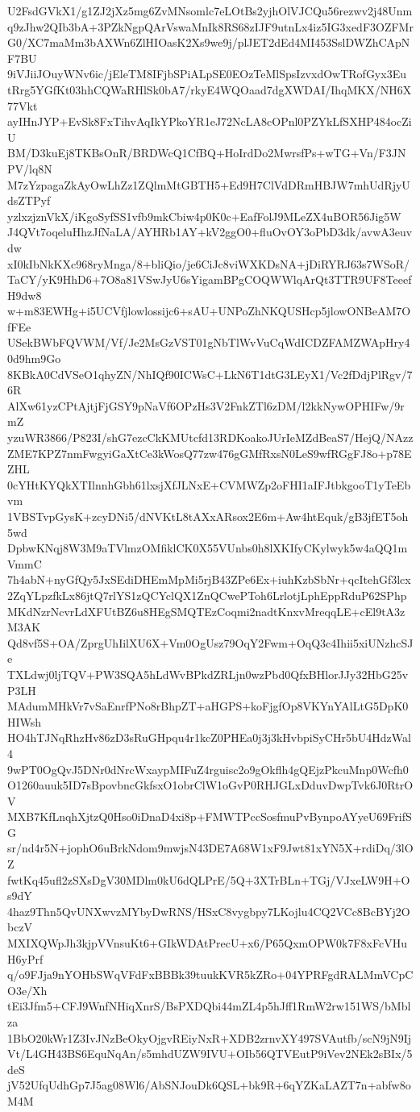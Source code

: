 U2FsdGVkX1/g1ZJ2jXz5mg6ZvMNsomlc7eLOtBs2yjhOlVJCQu56rezwv2j48Unm
q9zJhw2QIb3bA+3PZkNgpQArVswaMnIk8RS68zIJF9utnLx4iz5IG3xedF3OZFMr
G0/XC7maMm3bAXWn6ZlHIOasK2Xs9we9j/plJET2dEd4MI453SslDWZhCApNF7BU
9iVJiiJOuyWNv6ic/jEleTM8IFjbSPiALpSE0EOzTeMlSpsIzvxdOwTRofGyx3Eu
tRrg5YGfKt03hhCQWaRHlSk0bA7/rkyE4WQOaad7dgXWDAI/IhqMKX/NH6X77Vkt
ayIHnJYP+EvSk8FxTihvAqIkYPkoYR1eJ72NcLA8cOPnl0PZYkLfSXHP484ocZiU
BM/D3kuEj8TKBsOnR/BRDWcQ1CfBQ+HoIrdDo2MwrsfPs+wTG+Vn/F3JNPV/lq8N
M7zYzpagaZkAyOwLhZz1ZQlmMtGBTH5+Ed9H7ClVdDRmHBJW7mhUdRjyUdsZTPyf
yzlxzjznVkX/iKgoSyfSS1vfb9mkCbiw4p0K0c+EafFolJ9MLeZX4uBOR56Jig5W
J4QVt7oqeluHhzJfNaLA/AYHRb1AY+kV2ggO0+fluOvOY3oPbD3dk/avwA3euvdw
xI0kIbNkKXc968ryMnga/8+bliQio/je6CiJc8viWXKDsNA+jDiRYRJ63s7WSoR/
TaCY/yK9HhD6+7O8a81VSwJyU6sYigamBPgCOQWWlqArQt3TTR9UF8TeeefH9dw8
w+m83EWHg+i5UCVfjlowlossijc6+sAU+UNPoZhNKQUSHcp5jlowONBeAM7OfFEe
USekBWbFQVWM/Vf/Je2MsGzVST01gNbTlWvVuCqWdICDZFAMZWApHry40d9hm9Go
8KBkA0CdVSeO1qhyZN/NhIQf90ICWsC+LkN6T1dtG3LEyX1/Vc2fDdjPlRgv/76R
AlXw61yzCPtAjtjFjGSY9pNaVf6OPzHs3V2FnkZTl6zDM/l2kkNywOPHIFw/9rmZ
yzuWR3866/P823I/shG7ezcCkKMUtcfd13RDKoakoJUrIeMZdBeaS7/HejQ/NAzz
ZME7KPZ7nmFwgyiGaXtCe3kWosQ77zw476gGMfRxsN0LeS9wfRGgFJ8o+p78EZHL
0cYHtKYQkXTIlnnhGbh61lxsjXfJLNxE+CVMWZp2oFHI1aIFJtbkgooT1yTeEbvm
1VBSTvpGysK+zcyDNi5/dNVKtL8tAXxARsox2E6m+Aw4htEquk/gB3jfET5oh5wd
DpbwKNqj8W3M9aTVlmzOMfiklCK0X55VUnbs0h8lXKIfyCKylwyk5w4aQQ1mVmmC
7h4abN+nyGfQy5JxSEdiDHEmMpMi5rjB43ZPe6Ex+iuhKzbSbNr+qcItehGf3lcx
2ZqYLpzfkLx86jtQ7rlYS1zQCYclQX1ZnQCwePToh6LrlotjLphEppRduP62SPhp
MKdNzrNcvrLdXFUtBZ6u8HEgSMQTEzCoqmi2nadtKnxvMreqqLE+cEl9tA3zM3AK
Qd8vf5S+OA/ZprgUhIilXU6X+Vm0OgUsz79OqY2Fwm+OqQ3c4Ihii5xiUNzhcSJe
TXLdwj0ljTQV+PW3SQA5hLdWvBPkdZRLjn0wzPbd0QfxBHlorJJy32HbG25vP3LH
MAdumMHkVr7vSaEnrfPNo8rBhpZT+aHGPS+koFjgfOp8VKYnYAlLtG5DpK0HIWsh
HO4hTJNqRhzHv86zD3sRuGHpqu4r1kcZ0PHEa0j3j3kHvbpiSyCHr5bU4HdzWal4
9wPT0OgQvJ5DNr0dNrcWxaypMIFuZ4rguisc2o9gOkflh4gQEjzPkcuMnp0Wcfh0
O1260auuk5ID7sBpovbncGkfsxO1obrClW1oGvP0RHJGLxDduvDwpTvk6J0RtrOV
MXB7KfLnqhXjtzQ0Hso0iDnaD4xi8p+FMWTPccSosfmuPvBynpoAYyeU69FrifSG
sr/nd4r5N+jophO6uBrkNdom9mwjsN43DE7A68W1xF9Jwt81xYN5X+rdiDq/3lOZ
fwtKq45ufl2zSXsDgV30MDlm0kU6dQLPrE/5Q+3XTrBLn+TGj/VJxeLW9H+Os9dY
4haz9Thn5QvUNXwvzMYbyDwRNS/HSxC8vygbpy7LKojlu4CQ2VCc8BcBYj2ObczV
MXIXQWpJh3kjpVVnsuKt6+GIkWDAtPrecU+x6/P65QxmOPW0k7F8xFcVHuH6yPrf
q/o9FJja9nYOHbSWqVFdFxBBBk39tuukKVR5kZRo+04YPRFgdRALMmVCpCO3e/Xh
tEi3Jfm5+CFJ9WnfNHiqXnrS/BsPXDQbi44mZL4p5hJff1RmW2rw151WS/bMblza
1BbO20kWr1Z3IvJNzBeOkyOjgvREiyNxR+XDB2zrnvXY497SVAutfb/scN9jN9Ij
Vt/L4GH43BS6EquNqAn/s5mhdUZW9IVU+OIb56QTVEutP9iVev2NEk2sBIx/5deS
jV52UfqUdhGp7J5ag08Wl6/AbSNJouDk6QSL+bk9R+6qYZKaLAZT7n+abfw8oM4M
